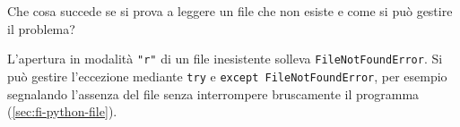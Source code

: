 \begin{exercise}
\label{ex:fi-python-file-inesistente}
Che cosa succede se si prova a leggere un file che non esiste e
come si può gestire il problema?
\end{exercise}

L'apertura in modalità \lstinline|"r"| di un file inesistente
solleva \texttt{FileNotFoundError}. Si può gestire l'eccezione
mediante \texttt{try} e \texttt{except FileNotFoundError},
per esempio segnalando l'assenza del file senza interrompere
bruscamente il programma (\cref{sec:fi-python-file}).
